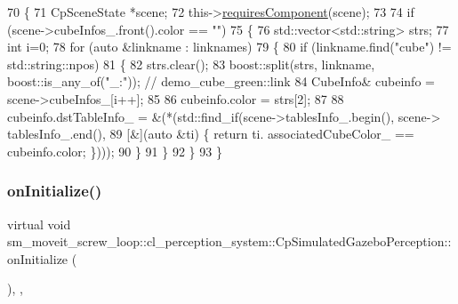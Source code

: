 \begin{DoxyCode}
70             \{
71                 CpSceneState *scene;
72                 this->\hyperlink{classsmacc_1_1ISmaccComponent_aa06d58b1dcec3c513ca2edddfd3847ec}{requiresComponent}(scene);
73 
74                 \textcolor{keywordflow}{if} (scene->cubeInfos\_.front().color == \textcolor{stringliteral}{""})
75                 \{
76                     std::vector<std::string> strs;
77                     \textcolor{keywordtype}{int} i=0;
78                     \textcolor{keywordflow}{for} (\textcolor{keyword}{auto} &linkname : linknames)
79                     \{
80                         \textcolor{keywordflow}{if} (linkname.find(\textcolor{stringliteral}{"cube"}) != std::string::npos)
81                         \{
82                             strs.clear();
83                             boost::split(strs, linkname, boost::is\_any\_of(\textcolor{stringliteral}{"\_:"})); \textcolor{comment}{// demo\_cube\_green::link}
84                             CubeInfo& cubeinfo = scene->cubeInfos\_[i++];
85 
86                             cubeinfo.color = strs[2];
87 
88                             cubeinfo.dstTableInfo\_ = &(*(std::find\_if(scene->tablesInfo\_.begin(), scene->
      tablesInfo\_.end(),
89                                                                       [&](\textcolor{keyword}{auto} &ti) \{ \textcolor{keywordflow}{return} ti.
      associatedCubeColor\_ == cubeinfo.color; \})));
90                         \}
91                     \}
92                 \}
93             \}
\end{DoxyCode}
\mbox{\label{classsm__moveit__screw__loop_1_1cl__perception__system_1_1CpSimulatedGazeboPerception_a7a683c96ef7ea9e26e856f104c3b8249}} 
\subsubsection{\texorpdfstring{on\+Initialize()}{onInitialize()}}
{\footnotesize\ttfamily virtual void sm\+\_\+moveit\+\_\+screw\+\_\+loop\+::cl\+\_\+perception\+\_\+system\+::\+Cp\+Simulated\+Gazebo\+Perception\+::on\+Initialize (\begin{DoxyParamCaption}{ }\end{DoxyParamCaption})\hspace{0.3cm}{\ttfamily [inline]}, {\ttfamily [override]}, {\ttfamily [virtual]}}



